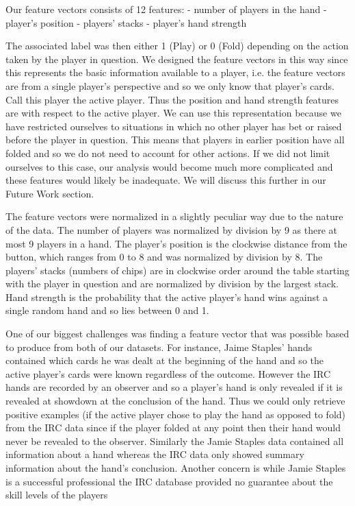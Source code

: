 \documentclass[twoside]{article}
\begin{document}
\begin{multicols}{2}
Our feature vectors consists of 12 features: \newline
\indent - number of players in the hand\newline
\indent - player's position \newline
\indent - players' stacks \newline
\indent - player's hand strength \newline

The associated label was then either 1 (Play) or 0 (Fold) depending on the action taken by the player in question. We designed the feature vectors in this way since this represents the basic information available to a player, i.e. the feature vectors are from a single player's perspective and so we only know that player's cards. Call this player the active player. Thus the position and hand strength features are with respect to the active player. We can use this representation because we have restricted ourselves to situations in which no other player has bet or raised before the player in question. This means that players in earlier position have all folded and so we do not need to account for other actions. If we did not limit ourselves to this case, our analysis would become much more complicated and these features would likely be inadequate. We will discuss this further in our Future Work section.

The feature vectors were normalized in a slightly peculiar way due to the nature of the data. The number of players was normalized by division by 9 as there at most 9 players in a hand. The player's position is the clockwise distance from the button, which ranges from 0 to 8 and was normalized by division by 8. The players' stacks (numbers of chips) are in clockwise order around the table starting with the player in question and are normalized by division by the largest stack. Hand strength is the probability that the active player's hand wins against a single random hand and so lies between 0 and 1.

One of our biggest challenges was finding a feature vector that was possible based to produce from both of our datasets. For instance, Jaime Staples' hands contained which cards he was dealt at the beginning of the hand and so the active player's cards were known regardless of the outcome. However the IRC hands are recorded by an observer and so a player's hand is only revealed if it is revealed at showdown at the conclusion of the hand. Thus we could only retrieve positive examples (if the active player chose to play the hand as opposed to fold) from the IRC data since if the player folded at any point then their hand would never be revealed to the observer. Similarly the Jamie Staples data contained all information about a hand whereas the IRC data only showed summary information about the hand's conclusion. Another concern is while Jamie Staples is a successful professional \cite{JaimeStaples} the IRC database provided no guarantee about the skill levels of the players


\end{multicols}
\end{document}
